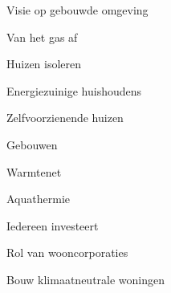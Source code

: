 
\begin{visie-concept}{Visie op gebouwde omgeving}\end{visie-concept}

\begin{voorstel-concept}{Van het gas af}\end{voorstel-concept}
\begin{voorstel-concept}{Huizen isoleren}\end{voorstel-concept}
\begin{voorstel-concept}{Energiezuinige huishoudens}\end{voorstel-concept}
\begin{voorstel-concept}{Zelfvoorzienende huizen}\end{voorstel-concept}
\begin{voorstel-concept}{Gebouwen}\end{voorstel-concept}
\begin{voorstel-concept}{Warmtenet}\end{voorstel-concept}
\begin{voorstel-concept}{Aquathermie}\end{voorstel-concept}
\begin{voorstel-concept}{Iedereen investeert}\end{voorstel-concept}
\begin{voorstel-concept}{Rol van wooncorporaties}\end{voorstel-concept}
\begin{voorstel-concept}{Bouw klimaatneutrale woningen}\end{voorstel-concept}
 